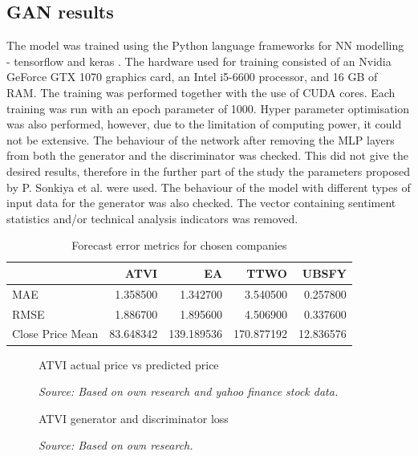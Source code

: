 \documentclass[11pt]{article} %
\begin{document}
\subsection{GAN results}

The model was trained using the Python language frameworks for NN modelling - tensorflow \cite{tensorflow}  and keras \cite{keras}\cite{keras-2}. The hardware used for training consisted of an Nvidia GeForce GTX 1070 graphics card, an Intel i5-6600 processor, and 16 GB of RAM. The training was performed together with the use of CUDA cores. Each training was run with an epoch parameter of 1000. Hyper parameter optimisation was also performed,  however, due to the limitation of computing power, it could not be extensive. The behaviour of the network after removing the MLP layers from both the generator and the discriminator was checked. This did not give the desired results, therefore in the further part of the study the parameters proposed by P. Sonkiya et al. were used. The behaviour of the model with different types of input data for the generator was also checked. The vector containing sentiment statistics and/or technical analysis indicators was removed. 

\begin{table}[H]
\centering
\caption{Forecast error metrics for chosen companies}
\begin{tabular}{lrrrr}
\toprule
{} &       ATVI &          EA &        TTWO &      UBSFY \\
\midrule
MAE              &   1.358500 &    1.342700 &    3.540500 &   0.257800 \\
RMSE             &   1.886700 &    1.895600 &    4.506900 &   0.337600 \\
Close Price Mean &  83.648342 &  139.189536 &  170.877192 &  12.836576 \\
\bottomrule
\end{tabular}
\end{table}

\begin{figure}[H]
\caption{ATVI actual price vs predicted price}
\begin{adjustbox}{width=1.3\textwidth,center}

\end{adjustbox}
\caption*{\textit{Source: Based on own research and yahoo finance stock data.}}
\end{figure}

\begin{figure}[H]
\caption{ATVI generator and discriminator loss}
\begin{adjustbox}{width=1.3\textwidth,center}

\end{adjustbox}
\caption*{\textit{Source: Based on own research.}}
\end{figure}
\end{document}
